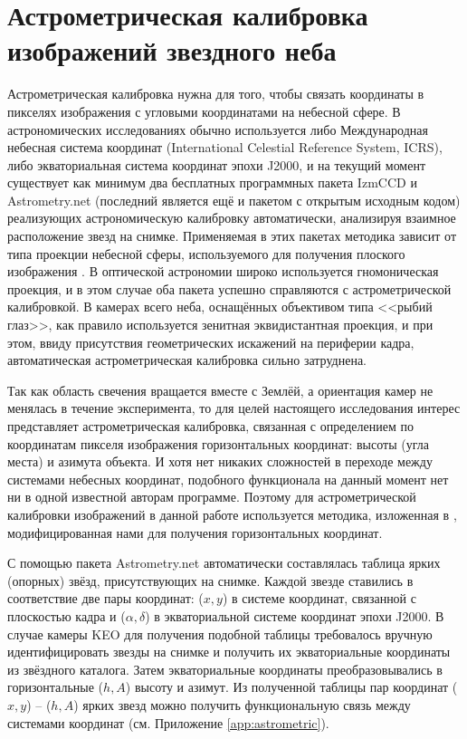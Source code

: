 \documentclass[12pt,a4paper]{article}
\begin{document}
\section{Астрометрическая калибровка изображений звездного неба} \label{sec:astro_cal}
Астрометрическая калибровка нужна для того, чтобы связать координаты в пикселях изображения с угловыми координатами на небесной сфере. В астрономических исследованиях обычно используется либо Международная небесная система координат (International Celestial Reference System, ICRS), либо экваториальная система координат эпохи J2000, и на текущий момент существует как минимум два бесплатных программных пакета IzmCCD \cite{Izmccd,Izmailov2010} и Astrometry.net \cite{Astrometry.net, Lang2010} (последний является ещё и пакетом с открытым исходным кодом) реализующих астрономическую калибровку автоматически, анализируя взаимное расположение звезд на снимке. Применяемая в этих пакетах методика зависит от типа проекции небесной сферы, используемого для получения плоского изображения \cite{Calabretta2002}. В оптической астрономии широко используется гномоническая проекция, и в этом случае оба пакета успешно справляются с астрометрической калибровкой. В камерах всего неба, оснащённых объективом типа <<рыбий глаз>>, как правило используется зенитная эквидистантная проекция, и при этом, ввиду присутствия геометрических искажений на периферии кадра, автоматическая астрометрическая калибровка сильно затруднена.

Так как область свечения вращается вместе с Землёй, а ориентация камер не менялась в течение эксперимента, то для целей настоящего исследования интерес представляет астрометрическая калибровка, связанная с определением по координатам пикселя изображения горизонтальных координат: высоты (угла места) и азимута объекта. И хотя нет никаких сложностей в переходе между системами небесных координат, подобного функционала на данный момент нет ни в одной известной авторам программе. Поэтому для астрометрической калибровки изображений в данной работе используется методика, изложенная в \cite{Montenbruck2000}, модифицированная нами для получения горизонтальных координат.

С помощью пакета Astrometry.net автоматически составлялась таблица ярких (опорных) звёзд, присутствующих на снимке. Каждой звезде ставились в соответствие две пары координат: ($x,y$) в системе координат, связанной с плоскостью кадра и ($\alpha, \delta$) в экваториальной системе координат эпохи J2000. В случае камеры KEO для получения подобной таблицы требовалось вручную идентифицировать звезды на снимке и получить их экваториальные координаты из звёздного каталога. Затем экваториальные координаты преобразовывались в горизонтальные ($h,A$) высоту и азимут. Из полученной таблицы пар координат ($x,y$) -- ($h,A$) ярких звезд можно получить функциональную связь между системами координат (см. Приложение \ref{app:astrometric}).
\end{document}
